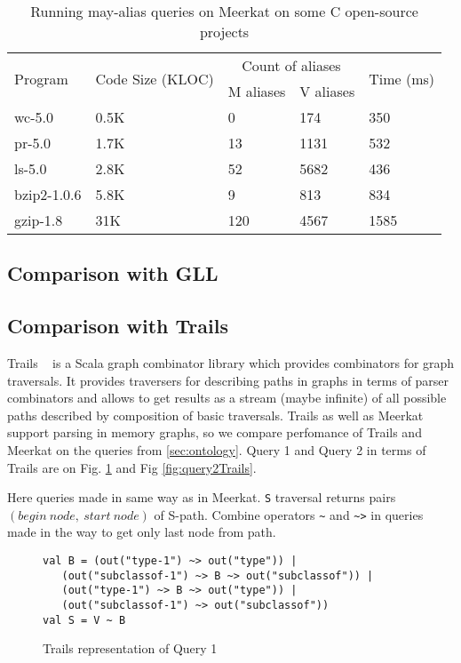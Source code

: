 \begin{table}[t]
\centering
\begin{tabular}{|l|l|ll|l|}
\hline
\multirow{2}{*}{Program} & \multirow{2}{*}{Code Size (KLOC)} & \multicolumn{2}{c|}{Count of aliases} & \multirow{2}{*}{Time (ms)} \\ \cline{3-4}
 &  & \multicolumn{1}{c|}{M aliases} & \multicolumn{1}{c|}{V aliases} &  \\ 
\hline
\hline
wc-5.0      & 0.5K & 0   & 174  & 350 \\
pr-5.0      & 1.7K & 13  & 1131 & 532 \\
ls-5.0      & 2.8K & 52  & 5682 & 436 \\
bzip2-1.0.6 & 5.8K & 9   & 813  & 834 \\
gzip-1.8    & 31K  & 120 & 4567 & 1585\\
\hline
\end{tabular}
\caption{Running may-alias queries on Meerkat on some C open-source projects}
\label{table:staticAnalysis}
\end{table}


\subsection{Comparison with GLL}

\subsection{Comparison with Trails}
Trails ~\cite{ScalaGraphParsing} is a Scala graph combinator library which provides combinators for graph traversals. It provides traversers for describing paths in graphs in terms of parser combinators and allows to get results as a stream (maybe infinite) of all possible paths described by composition of basic traversals. Trails as well as Meerkat support parsing in memory graphs, so we compare perfomance of Trails and Meerkat on the queries from \autoref{sec:ontology}. Query 1 and Query 2 in terms of Trails are on Fig. \ref{fig:query1Trails} and Fig \ref{fig:query2Trails}.

Here queries made in same way as in Meerkat. \lstinline{S} traversal returns pairs $(begin\ node,\ start\ node)$ of S-path. Combine operators \lstinline{~} and \lstinline{~>} in queries made in the way to get only last node from path.


\begin{figure}[h]
\begin{lstlisting}
val B = (out("type-1") ~> out("type")) |
   (out("subclassof-1") ~> B ~> out("subclassof")) |
   (out("type-1") ~> B ~> out("type")) |
   (out("subclassof-1") ~> out("subclassof"))
val S = V ~ B
\end{lstlisting}
\caption{Trails representation of Query 1}
\label{fig:query1Trails}
\end{figure}

